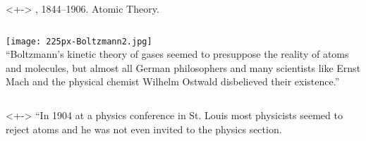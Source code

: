 \begin{frame}

  \begin{block}<+->{ , 1844--1906. Atomic Theory.}
    \begin{columns}
      \texttt{[image: 225px-Boltzmann2.jpg]}\\
      \small
      ``Boltzmann's kinetic theory of gases seemed to presuppose the
      reality of atoms and molecules, but almost all German philosophers and
      many scientists like Ernst Mach and the physical chemist Wilhelm
      Ostwald disbelieved their existence.''
    \end{columns}
  \end{block}
  \begin{block}<+->{}
    \small
    ``In 1904 at a physics conference in St. Louis most
    physicists seemed to reject atoms and he was not even invited
    to the physics section.
    \\
  \end{block}

\end{frame}

